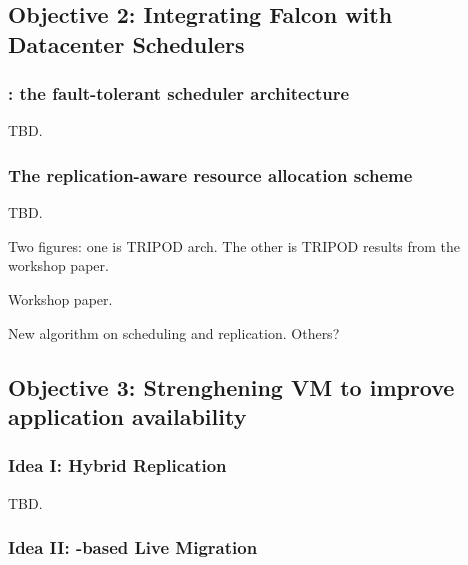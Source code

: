 \vspace{-.15in}\subsection{Objective 2: 
Integrating Falcon with Datacenter Schedulers}\label{sec:detect}\vspace{-.075in}

\vspace{-.15in}\subsubsection{\tripod: the fault-tolerant scheduler 
architecture} 
\label{sec:scheduler-arch}\vspace{-.075in}

TBD.


\vspace{-.15in}\subsubsection{The replication-aware resource allocation scheme}
\label{sec:detect-arch}\vspace{-.075in}

TBD.

Two figures: one is TRIPOD arch. The other is TRIPOD results from the workshop 
paper.

 Workshop paper.

 New algorithm on scheduling and replication. Others?

\vspace{-.15in}\subsection{Objective 3: 
Strenghening VM to improve application 
availability}\label{sec:defense}\vspace{-.075in}


\vspace{-.15in}\subsubsection{Idea I: Hybrid Replication} 
\label{sec:defense-arch}\vspace{-.075in}

TBD.

\vspace{-.15in}\subsubsection{Idea II: \paxos-based Live Migration} 
\label{sec:defense-arch}\vspace{-.075in}

